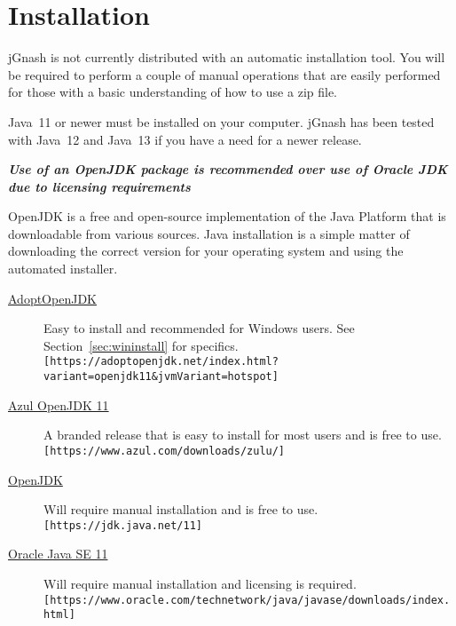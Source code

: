 \documentclass[letterpaper,12pt]{book}
\begin{document}
    \section{Installation}\label{sec:installation}
    jGnash is not currently distributed with an automatic installation tool.
    You will be required to perform a couple of manual operations that are easily performed for those with a basic
    understanding of how to use a zip file.
    
    Java\texttrademark~11 or newer must be installed on your computer. jGnash has been tested with Java\texttrademark~12
    and Java\texttrademark~13 if you have a need for a newer release.

    \textit{\textbf{Use of an OpenJDK package is recommended over use of Oracle JDK due to licensing requirements}}

    OpenJDK is a free and open-source implementation of the Java Platform that is downloadable from various sources.
    Java installation is a simple matter of downloading the correct version for your operating system and using the
    automated installer.

    \begin{description}
        \item[\href{https://adoptopenjdk.net/index.html?variant=openjdk11&jvmVariant=hotspot}{AdoptOpenJDK}]
        Easy to install and recommended for Windows users. See Section~\ref{sec:wininstall} for specifics. \\
        \texttt{[https://adoptopenjdk.net/index.html?variant=openjdk11\&jvmVariant=hotspot]}
        \item[\href{https://www.azul.com/downloads/zulu/}{Azul OpenJDK 11}]
        A branded release that is easy to install for most users and is free to use. \\
        \texttt{[https://www.azul.com/downloads/zulu/]}        
        \item [\href{https://jdk.java.net/11/}{OpenJDK}]
        Will require manual installation and is free to use. \\
        \texttt{[https://jdk.java.net/11]}
        \item[\href{https://www.oracle.com/technetwork/java/javase/downloads/index.html}{Oracle Java SE 11}]
        Will require manual installation and licensing is required. \\
        \texttt{[https://www.oracle.com/technetwork/java/javase/downloads/index.html]}
    \end{description}
\end{document}
